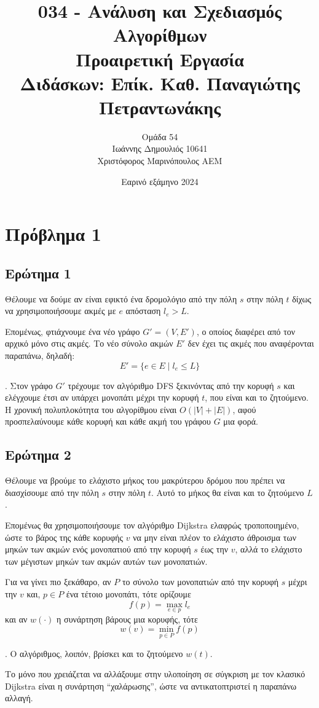\documentclass[12pt]{article}
\title{\vspace{-2cm}034 - Ανάλυση και Σχεδιασμός Αλγορίθμων\\ 
         Προαιρετική Εργασία \\
         \large Διδάσκων: Επίκ. Καθ. Παναγιώτης Πετραντωνάκης}
\author{Ομάδα 54 \\
        Ιωάννης Δημουλιός 10641 \\
        Χριστόφορος Μαρινόπουλος ΑΕΜ}
\date{Εαρινό εξάμηνο 2024}
\begin{document}
\maketitle

\section*{Πρόβλημα 1}
\subsection*{Ερώτημα 1}
Θέλουμε να δούμε αν είναι εφικτό ένα δρομολόγιο από την πόλη \(s\) στην πόλη \(t\) δίχως να χρησιμοποιήσουμε ακμές με \(e\) απόσταση \(l_e > L\). 

Επομένως, φτιάχνουμε ένα νέο γράφο \(G' = (V, E')\), ο οποίος διαφέρει από τον αρχικό μόνο στις ακμές. Το νέο σύνολο ακμών \(E'\) δεν έχει τις ακμές που αναφέρονται παραπάνω, δηλαδή: 
\[
    E' = \{e \in E \mid l_e \leq L\}
\]

. Στον γράφο \(G'\) τρέχουμε τον αλγόριθμο DFS ξεκινόντας από την κορυφή \(s\) και ελέγχουμε έτσι αν υπάρχει μονοπάτι μέχρι την κορυφή \(t\), που είναι και το ζητούμενο. 
Η χρονική πολυπλοκότητα του αλγορίθμου είναι \(O(|V| + |E|)\), αφού προσπελαύνουμε κάθε κορυφή και κάθε ακμή του γράφου \(G\) μια φορά. \hfill \blacksquare

\subsection*{Ερώτημα 2}
Θέλουμε να βρούμε το ελάχιστο μήκος του μακρύτερου δρόμου που πρέπει να διασχίσουμε από την πόλη \(s\) στην πόλη \(t\). Αυτό το μήκος θα είναι και το ζητούμενο \(L\). 

Επομένως θα χρησιμοποιήσουμε τον αλγόριθμο Dijkstra ελαφρώς τροποποιημένο, ώστε το βάρος της κάθε κορυφής \(v\) να μην είναι πλέον το ελάχιστο άθροισμα των μηκών των ακμών ενός μονοπατιού από την κορυφή \(s\) έως την \(v\), αλλά το ελάχιστο των μέγιστων μηκών των ακμών αυτών των μονοπατιών. 

Για να γίνει πιο ξεκάθαρο, αν \(P\) το σύνολο των μονοπατιών από την κορυφή \(s\) μέχρι την \(v\) και, \(p \in P\) ένα τέτοιο μονοπάτι, τότε ορίζουμε
\[
    f(p) = \max_{e\in p} l_e
\]
και αν \(w(\cdot)\) η συνάρτηση βάρους μια κορυφής, τότε 
\[
    w(v) = \min_{p\in P} f(p)
\]

. O αλγόριθμος, λοιπόν, βρίσκει και το ζητούμενο \(w(t)\).

Το μόνο που χρειάζεται να αλλάξουμε στην υλοποίηση σε σύγκριση με τον κλασικό Dijkstra είναι η συνάρτηση ``χαλάρωσης'', ώστε να αντικατοπτριστεί η παραπάνω αλλαγή. 
\end{document}
